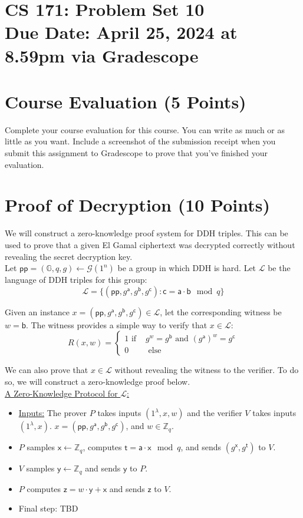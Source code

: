 \documentclass[11pt]{article}
\newcommand{\cL}{\mathcal{L}}
\newcommand{\GG}{\mathbb{G}}
\newcommand{\pp}{\mathsf{pp}}
\newcommand{\ZZ}{\mathbb{Z}}
\newcommand{\sfa}{\mathsf{a}}
\newcommand{\sfb}{\mathsf{b}}
\newcommand{\sfc}{\mathsf{c}}
\newcommand{\sft}{\mathsf{t}}
\newcommand{\sfx}{\mathsf{x}}
\newcommand{\sfy}{\mathsf{y}}
\newcommand{\sfz}{\mathsf{z}}
\newcommand{\secp}{\lambda}
\newcommand{\duedate}{April 25, 2024 at 8.59pm via Gradescope}
\numberwithin{equation}{section}
\begin{document}
\section*{CS 171: Problem Set 10\\ {\small Due Date: \duedate} }


\section{Course Evaluation (5 Points)}
Complete your course evaluation for this course. You can write as much or as little as you want. Include a screenshot of the submission receipt when you submit this assignment to Gradescope to prove that you've finished your evaluation.\pagebreak


\section{Proof of Decryption (10 Points)}
We will construct a zero-knowledge proof system for DDH triples. This can be used to prove that a given El Gamal ciphertext was decrypted correctly without revealing the secret decryption key.\\

Let $\pp = (\GG, q, g) \leftarrow \mathcal{G}(1^n)$ be a group in which DDH is hard. Let $\cL$ be the language of DDH triples for this group:
\[\cL = \{(\pp, g^\sfa, g^\sfb, g^\sfc) : \sfc = \sfa \cdot \sfb \mod q\}\]

Given an instance $x = (\pp, g^\sfa, g^\sfb, g^\sfc) \in \cL$, let the corresponding witness be $w = \sfb$. The witness provides a simple way to verify that $x \in \cL$:
\[R(x, w) = 
\begin{cases}
    1 \text{ if } & g^{w} = g^\sfb \text{ and } (g^\sfa)^w = g^{\sfc}\\
    0 & \text{ else }
\end{cases}\]

We can also prove that $x \in \cL$ without revealing the witness to the verifier. To do so, we will construct a zero-knowledge proof below.\\

\noindent\underline{A Zero-Knowledge Protocol for $\cL$:}
\begin{itemize}
    \item \underline{Inputs:} The prover $P$ takes inputs $(1^\secp, x, w)$ and the verifier $V$ takes inputs $(1^\secp, x)$. $x = (\pp, g^\sfa, g^\sfb, g^\sfc)$, and $w \in \ZZ_q$.
    \item $P$ samples $\sfx \leftarrow \ZZ_q$, computes $\sft = \sfa \cdot \sfx \mod q$, and sends $(g^\sfx,g^{\sft})$ to $V$. 
    \item $V$ samples $\sfy \leftarrow \mathbb{Z}_q$ and sends $\sfy$ to $P$.
    \item $P$ computes $\sfz = w \cdot \sfy + \sfx$ and sends $\sfz$ to $V$.
    \item Final step: TBD
\end{itemize}
\end{document}
